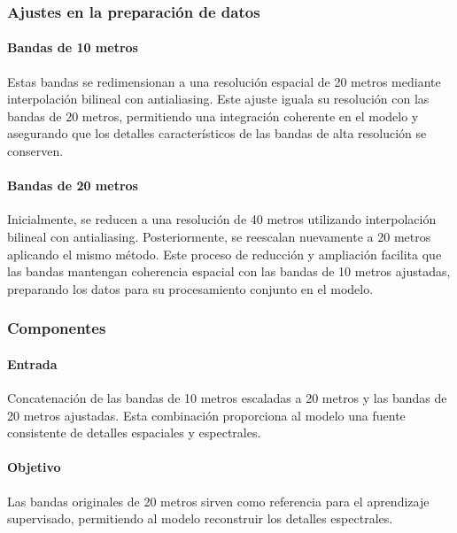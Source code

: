         \subsubsection{Ajustes en la preparación de datos}

            \paragraph{Bandas de 10 metros}

                Estas bandas se redimensionan a una resolución espacial de 20 metros mediante interpolación bilineal con antialiasing. Este ajuste iguala su resolución con las bandas de 20 metros, permitiendo una integración coherente en el modelo y asegurando que los detalles característicos de las bandas de alta resolución se conserven.

            \paragraph{Bandas de 20 metros}

                Inicialmente, se reducen a una resolución de 40 metros utilizando interpolación bilineal con antialiasing. Posteriormente, se reescalan nuevamente a 20 metros aplicando el mismo método. Este proceso de reducción y ampliación facilita que las bandas mantengan coherencia espacial con las bandas de 10 metros ajustadas, preparando los datos para su procesamiento conjunto en el modelo.


        \subsubsection{Componentes}
   
            \paragraph{Entrada}

                Concatenación de las bandas de 10 metros escaladas a 20 metros y las bandas de 20 metros ajustadas. Esta combinación proporciona al modelo una fuente consistente de detalles espaciales y espectrales.

            \paragraph{Objetivo}

                Las bandas originales de 20 metros sirven como referencia para el aprendizaje supervisado, permitiendo al modelo reconstruir los detalles espectrales.

